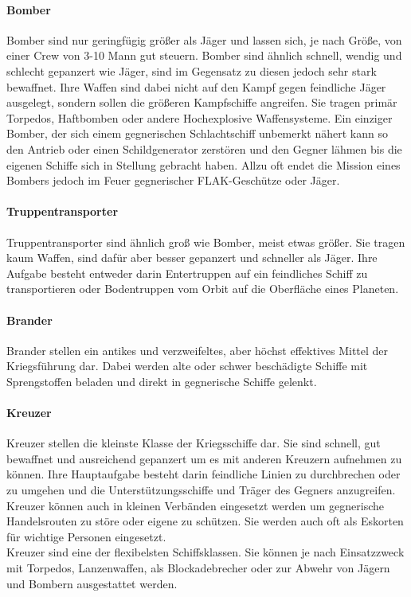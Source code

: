 \documentclass[11pt, a4paper]{article}
\begin{document}
\paragraph{Bomber}
Bomber sind nur geringfügig größer als Jäger und lassen sich, je nach Größe, von einer Crew von 3-10 Mann 
gut steuern. Bomber sind ähnlich schnell, wendig und schlecht gepanzert wie Jäger, sind im Gegensatz zu diesen
jedoch sehr stark bewaffnet. Ihre Waffen sind dabei nicht auf den Kampf gegen feindliche Jäger ausgelegt, 
sondern sollen die größeren Kampfschiffe angreifen. Sie tragen primär Torpedos, Haftbomben oder andere 
Hochexplosive Waffensysteme. Ein einziger Bomber, der sich einem gegnerischen Schlachtschiff unbemerkt nähert
kann so den Antrieb oder einen Schildgenerator zerstören und den Gegner lähmen bis die eigenen Schiffe sich
in Stellung gebracht haben. Allzu oft endet die Mission eines Bombers jedoch im Feuer gegnerischer 
FLAK-Geschütze oder Jäger.
%
\paragraph{Truppentransporter}
Truppentransporter sind ähnlich groß wie Bomber, meist etwas größer. Sie tragen kaum Waffen, sind dafür aber
besser gepanzert und schneller als Jäger. Ihre Aufgabe besteht entweder darin Entertruppen auf ein feindliches
Schiff zu transportieren oder Bodentruppen vom Orbit auf die Oberfläche eines Planeten.
%
\paragraph{Brander}
Brander stellen ein antikes und verzweifeltes, aber höchst effektives Mittel der Kriegsführung dar. Dabei 
werden alte oder schwer beschädigte Schiffe mit Sprengstoffen beladen und direkt in gegnerische Schiffe 
gelenkt. 
%
\paragraph{Kreuzer}
Kreuzer stellen die kleinste Klasse der Kriegsschiffe dar. Sie sind schnell, gut bewaffnet und ausreichend 
gepanzert um es mit anderen Kreuzern aufnehmen zu können. Ihre Hauptaufgabe besteht darin feindliche Linien
zu durchbrechen oder zu umgehen und die Unterstützungsschiffe und Träger des Gegners anzugreifen. Kreuzer
können auch in kleinen Verbänden eingesetzt werden um gegnerische Handelsrouten zu störe oder eigene zu
schützen. Sie werden auch oft als Eskorten für wichtige Personen eingesetzt.\\
Kreuzer sind eine der flexibelsten Schiffsklassen. Sie können je nach Einsatzzweck mit Torpedos, Lanzenwaffen,
als Blockadebrecher oder zur Abwehr von Jägern und Bombern ausgestattet werden.
%
\end{document}
